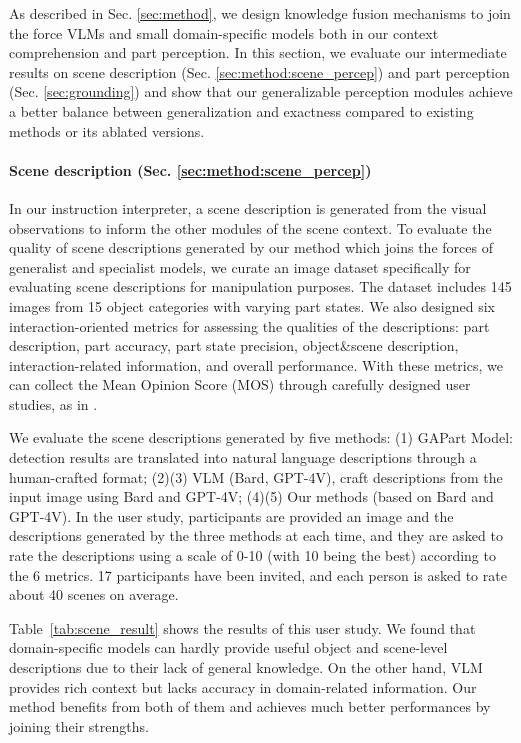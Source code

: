 As described in Sec. \ref{sec:method}, we design knowledge fusion mechanisms to join the force VLMs and small domain-specific models both in our context comprehension and part perception. In this section, we evaluate our intermediate results on scene description (Sec. \ref{sec:method:scene_percep}) and part perception (Sec. \ref{sec:grounding}) and show that our generalizable perception modules achieve a better balance between generalization and exactness compared to existing methods or its ablated versions.


\paragraph{Scene description (Sec. \ref{sec:method:scene_percep})}
In our instruction interpreter, a scene description is generated from the visual observations to inform the other modules of the scene context.
%
To evaluate the quality of scene descriptions generated by our method which joins the forces of generalist and specialist models, 
we curate an image dataset specifically for evaluating scene descriptions for manipulation purposes. The dataset includes 145 images from 15 object categories with varying part states.
%
We also designed six interaction-oriented metrics for assessing the qualities of the descriptions: part description, part accuracy, part state precision, object\&scene description, interaction-related information, and overall performance.
With these metrics, we can collect the Mean Opinion Score (MOS) through carefully designed user studies, as in \citep{gal2022image}.


We evaluate the scene descriptions generated by five methods:  (1) GAPart Model: detection results are translated into natural language descriptions through a human-crafted format; (2)(3) VLM (Bard, GPT-4V), craft descriptions from the input image using Bard and GPT-4V; (4)(5) Our methods (based on Bard and GPT-4V).
%
In the user study, participants are provided an image and the descriptions generated by the three methods at each time, and they are asked to rate the descriptions using a scale of 0-10 (with 10 being the best) according to the 6 metrics. 17 participants have been invited, and each person is asked to rate about 40 scenes on average.


Table~\ref{tab:scene_result} shows the results of this user study. We found that domain-specific models can hardly provide useful object and scene-level descriptions due to their lack of general knowledge. On the other hand, VLM provides rich context but lacks accuracy in domain-related information. Our method benefits from both of them and achieves much better performances by joining their strengths.


